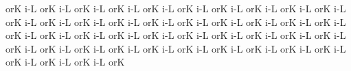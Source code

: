 \spatium
{}or\punctum K\egn
\sgn {}i-\punctum L\egn
\spatium
{}or\punctum K\egn
\sgn {}i-\punctum L\egn
\spatium
{}or\punctum K\egn
\sgn {}i-\punctum L\egn
\spatium
{}or\punctum K\egn
\sgn {}i-\punctum L\egn
\spatium
{}or\punctum K\egn
\sgn {}i-\punctum L\egn
\spatium
{}or\punctum K\egn
\sgn {}i-\punctum L\egn
\spatium
{}or\punctum K\egn
\sgn {}i-\punctum L\egn
\spatium
{}or\punctum K\egn
\sgn {}i-\punctum L\egn
\spatium
{}or\punctum K\egn
\sgn {}i-\punctum L\egn
\spatium
{}or\punctum K\egn
\sgn {}i-\punctum L\egn
\spatium
{}or\punctum K\egn
\sgn {}i-\punctum L\egn
\spatium
{}or\punctum K\egn
\sgn {}i-\punctum L\egn
\spatium
{}or\punctum K\egn
\sgn {}i-\punctum L\egn
\spatium
{}or\punctum K\egn
\sgn {}i-\punctum L\egn
\spatium
{}or\punctum K\egn
\sgn {}i-\punctum L\egn
\spatium
\lineaproxima
{}or\punctum K\egn
\sgn {}i-\punctum L\egn
\spatium
{}or\punctum K\egn
\sgn {}i-\punctum L\egn
\spatium
{}or\punctum K\egn
\sgn {}i-\punctum L\egn
\spatium
{}or\punctum K\egn
\sgn {}i-\punctum L\egn
\spatium
{}or\punctum K\egn
\sgn {}i-\punctum L\egn
\spatium
{}or\punctum K\egn
\sgn {}i-\punctum L\egn
\spatium
{}or\punctum K\egn
\sgn {}i-\punctum L\egn
\spatium
{}or\punctum K\egn
\sgn {}i-\punctum L\egn
\spatium
{}or\punctum K\egn
\sgn {}i-\punctum L\egn
\spatium
{}or\punctum K\egn
\sgn {}i-\punctum L\egn
\spatium
{}or\punctum K\egn
\sgn {}i-\punctum L\egn
\spatium
{}or\punctum K\egn
\sgn {}i-\punctum L\egn
\spatium
{}or\punctum K\egn
\sgn {}i-\punctum L\egn
\spatium
{}or\punctum K\egn
\sgn {}i-\punctum L\egn
\spatium
{}or\punctum K\egn
\sgn {}i-\punctum L\egn
\spatium
{}or\punctum K\egn
\sgn {}i-\punctum L\egn
\spatium
{}or\punctum K\egn
\sgn {}i-\punctum L\egn
\spatium
{}or\punctum K\egn
\sgn {}i-\punctum L\egn
\spatium
\lineaproxima
{}or\punctum K\egn
\sgn {}i-\punctum L\egn
\spatium
{}or\punctum K\egn
\sgn {}i-\punctum L\egn
\spatium
{}or\punctum K\egn
\sgn {}i-\punctum L\egn
\spatium
{}or\punctum K\egn
\sgn {}i-\punctum L\egn
\spatium
{}or\punctum K\egn
\sgn {}i-\punctum L\egn
\spatium
{}or\punctum K\egn
\sgn {}i-\punctum L\egn
\spatium
{}or\punctum K\egn
\sgn {}i-\punctum L\egn
\spatium
{}or\punctum K\egn
\sgn {}i-\punctum L\egn
\spatium
{}or\punctum K\egn
\sgn {}i-\punctum L\egn
\spatium
{}or\punctum K\egn
\sgn {}i-\punctum L\egn
\spatium
{}or\punctum K\egn

